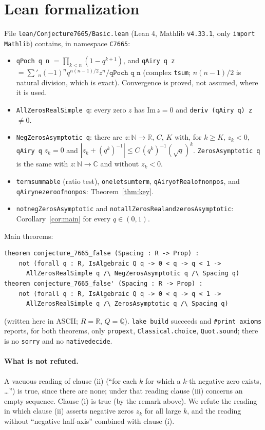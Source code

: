\documentclass[11pt]{article}
\theoremstyle{definition}
\theoremstyle{remark}
\renewcommand{\_}{\oldus\allowbreak}
\begin{document}
\section{Lean formalization}

File \texttt{lean/Conjecture7665/Basic.lean} (Lean 4, Mathlib \texttt{v4.33.1}, only \texttt{import Mathlib})
contains, in namespace \texttt{C7665}:
\begin{itemize}[leftmargin=*]
  \item \texttt{qPoch q n} $=\prod_{k<n}(1-q^{k+1})$, and \texttt{qAiry q z}
        $=\sum'_n (-1)^n q^{n(n-1)/2} z^n/\texttt{qPoch q n}$ (complex \texttt{tsum}; $n(n-1)/2$ is natural
        division, which is exact). Convergence is proved, not assumed, where it is used.
  \item \texttt{AllZerosRealSimple q}: every zero $z$ has $\mathrm{Im}\,z=0$ and
        \texttt{deriv (qAiry q) z} $\ne 0$.
  \item \texttt{NegZerosAsymptotic q}: there are $z:\mathbb N\to\mathbb R$, $C$, $K$ with, for $k\ge K$,
        $z_k<0$, \texttt{qAiry q} $z_k=0$ and $|z_k+(q^k)^{-1}|\le C\,(q^k)^{-1}(\sqrt q)^k$.
        \texttt{ZerosAsymptotic q} is the same with $z:\mathbb N\to\mathbb C$ and without $z_k<0$.
  \item \texttt{term\_summable} (ratio test), \texttt{one\_le\_tsum\_term}, \texttt{qAiry\_ofReal\_of\_nonpos},
        and \texttt{qAiry\_ne\_zero\_of\_nonpos}: Theorem~\ref{thm:key}.
  \item \texttt{not\_negZerosAsymptotic} and \texttt{not\_allZerosReal\_and\_zerosAsymptotic}:
        Corollary~\ref{cor:main} for every $q\in(0,1)$.
\end{itemize}
Main theorems:
\begin{verbatim}
theorem conjecture_7665_false (Spacing : R -> Prop) :
    not (forall q : R, IsAlgebraic Q q -> 0 < q -> q < 1 ->
      AllZerosRealSimple q /\ NegZerosAsymptotic q /\ Spacing q)
theorem conjecture_7665_false' (Spacing : R -> Prop) :
    not (forall q : R, IsAlgebraic Q q -> 0 < q -> q < 1 ->
      AllZerosRealSimple q /\ ZerosAsymptotic q /\ Spacing q)
\end{verbatim}
(written here in ASCII; $R=\mathbb R$, $Q=\mathbb Q$). \texttt{lake build} succeeds and
\texttt{\#print axioms} reports, for both theorems, only \texttt{propext}, \texttt{Classical.choice},
\texttt{Quot.sound}; there is no \texttt{sorry} and no \texttt{native\_decide}.

\paragraph{What is not refuted.} A vacuous reading of clause (ii) (``for each $k$ for which a $k$-th
negative zero exists, \dots'') is true, since there are none; under that reading clause (iii) concerns an
empty sequence. Clause (i) is true (by the remark above). We refute the reading in which clause (ii)
asserts negative zeros $z_k$ for all large $k$, and the reading without ``negative half-axis'' combined
with clause (i).
\end{document}
